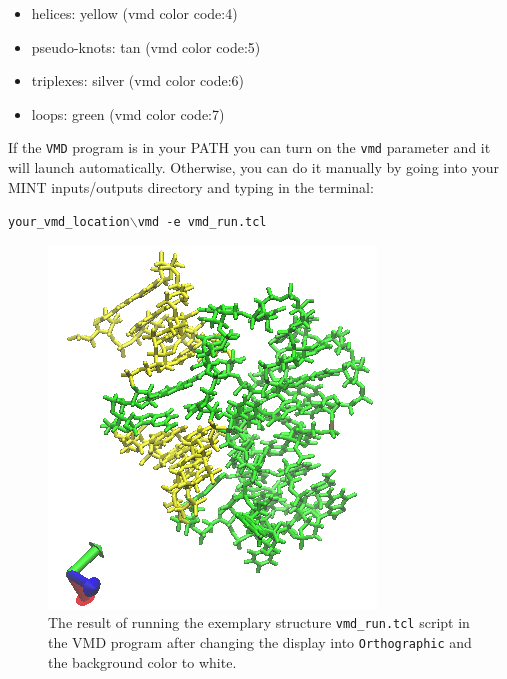 \documentclass[12pt]{article}
\begin{document}
\begin{itemize}
\item helices: yellow (vmd color code:4)
\item pseudo-knots: tan (vmd color code:5)
\item triplexes: silver (vmd color code:6)
\item loops: green (vmd color code:7)
\end{itemize}

If the \texttt{VMD} program is in your PATH you can turn on the \texttt{vmd} parameter and it will launch automatically. Otherwise, you can do it manually by going into your MINT inputs/outputs directory and typing in the terminal:

\texttt{your\_vmd\_location$\backslash$vmd -e vmd\_run.tcl }

\begin{figure}[h!]
\centering
\includegraphics[scale=0.8]{./pictures/motifs_vmd.png}
\caption{The result of running the exemplary structure \texttt{vmd\_run.tcl} script in the VMD program after changing the display into \texttt{Orthographic} and the background color to white.}
\end{figure}
\end{document}
